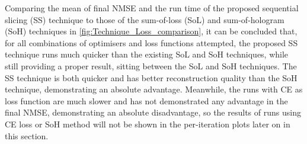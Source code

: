 Comparing the mean of final NMSE and the run time of the proposed sequential slicing (SS) technique to those of the sum-of-loss (SoL) and sum-of-hologram (SoH) techniques in \cref{fig:Technique_Loss_comparison}, it can be concluded that, for all combinations of optimisers and loss functions attempted, the proposed SS technique runs much quicker than the existing SoL and SoH techniques, while still providing a proper result, sitting between the SoL and SoH techniques. The SS technique is both quicker and has better reconstruction quality than the SoH technique, demonstrating an absolute advantage. Meanwhile, the runs with CE as loss function are much slower and has not demonstrated any advantage in the final NMSE, demonstrating an absolute disadvantage, so the results of runs using CE loss or SoH method will not be shown in the per-iteration plots later on in this section.

